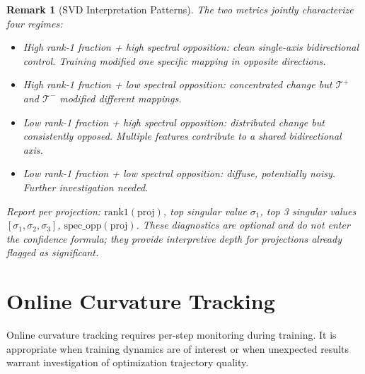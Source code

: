 \documentclass[11pt]{article}
\newtheorem{remark}{Remark}[section]
\begin{document}
\begin{remark}[SVD Interpretation Patterns]
The two metrics jointly characterize four regimes:
\begin{itemize}[nosep]
\item High rank-1 fraction + high spectral opposition: clean single-axis bidirectional control. Training modified one specific mapping in opposite directions.
\item High rank-1 fraction + low spectral opposition: concentrated change but $\mathcal{T}^+$ and $\mathcal{T}^-$ modified different mappings.
\item Low rank-1 fraction + high spectral opposition: distributed change but consistently opposed. Multiple features contribute to a shared bidirectional axis.
\item Low rank-1 fraction + low spectral opposition: diffuse, potentially noisy. Further investigation needed.
\end{itemize}
Report per projection: $\text{rank1}(\text{proj})$, top singular value $\sigma_1$, top 3 singular values $[\sigma_1, \sigma_2, \sigma_3]$, $\text{spec\_opp}(\text{proj})$. These diagnostics are optional and do not enter the confidence formula; they provide interpretive depth for projections already flagged as significant.
\end{remark}

\section{Online Curvature Tracking}
\label{app:curvature}

Online curvature tracking requires per-step monitoring during training. It is appropriate when training dynamics are of interest or when unexpected results warrant investigation of optimization trajectory quality.
\end{document}
